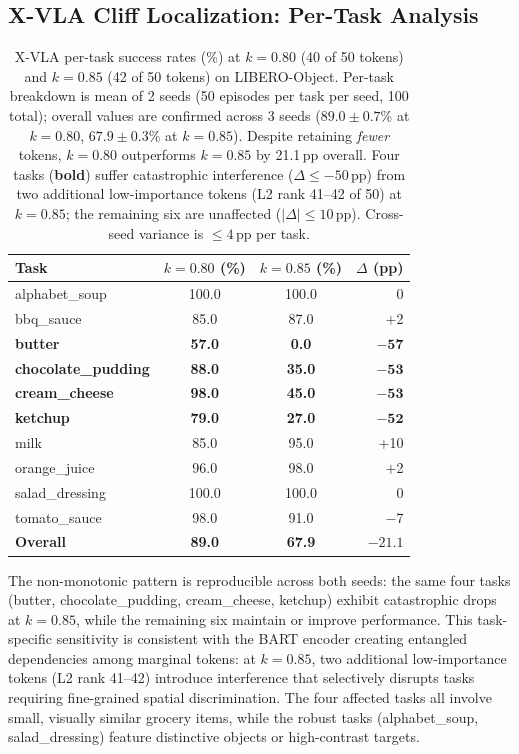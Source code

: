 \subsection{X-VLA Cliff Localization: Per-Task Analysis}
\label{app:xvla_cliff}

\begin{table}[ht]
\centering
\small
\caption{X-VLA per-task success rates (\%) at $k{=}0.80$ (40 of 50 tokens) and $k{=}0.85$ (42 of 50 tokens) on LIBERO-Object. Per-task breakdown is mean of 2 seeds (50 episodes per task per seed, 100 total); overall values are confirmed across 3 seeds ($89.0 \pm 0.7$\% at $k{=}0.80$, $67.9 \pm 0.3$\% at $k{=}0.85$). Despite retaining \emph{fewer} tokens, $k{=}0.80$ outperforms $k{=}0.85$ by 21.1\,pp overall. Four tasks (\textbf{bold}) suffer catastrophic interference ($\Delta \leq -50$\,pp) from two additional low-importance tokens (L2 rank 41--42 of 50) at $k{=}0.85$; the remaining six are unaffected ($|\Delta| \leq 10$\,pp). Cross-seed variance is $\leq 4$\,pp per task.}
\label{tab:xvla_cliff_pertask}
\begin{tabular}{lccr}
\toprule
Task & $k{=}0.80$ (\%) & $k{=}0.85$ (\%) & $\Delta$ (pp) \\
\midrule
alphabet\_soup & 100.0 & 100.0 & 0 \\
bbq\_sauce & 85.0 & 87.0 & $+$2 \\
\textbf{butter} & \textbf{57.0} & \textbf{0.0} & $\boldsymbol{-57}$ \\
\textbf{chocolate\_pudding} & \textbf{88.0} & \textbf{35.0} & $\boldsymbol{-53}$ \\
\textbf{cream\_cheese} & \textbf{98.0} & \textbf{45.0} & $\boldsymbol{-53}$ \\
\textbf{ketchup} & \textbf{79.0} & \textbf{27.0} & $\boldsymbol{-52}$ \\
milk & 85.0 & 95.0 & $+$10 \\
orange\_juice & 96.0 & 98.0 & $+$2 \\
salad\_dressing & 100.0 & 100.0 & 0 \\
tomato\_sauce & 98.0 & 91.0 & $-$7 \\
\midrule
\textbf{Overall} & \textbf{89.0} & \textbf{67.9} & $\boldsymbol{-21.1}$ \\
\bottomrule
\end{tabular}
\end{table}

The non-monotonic pattern is reproducible across both seeds: the same four tasks (butter, chocolate\_pudding, cream\_cheese, ketchup) exhibit catastrophic drops at $k{=}0.85$, while the remaining six maintain or improve performance. This task-specific sensitivity is consistent with the BART encoder creating entangled dependencies among marginal tokens: at $k{=}0.85$, two additional low-importance tokens (L2 rank 41--42) introduce interference that selectively disrupts tasks requiring fine-grained spatial discrimination. The four affected tasks all involve small, visually similar grocery items, while the robust tasks (alphabet\_soup, salad\_dressing) feature distinctive objects or high-contrast targets.

